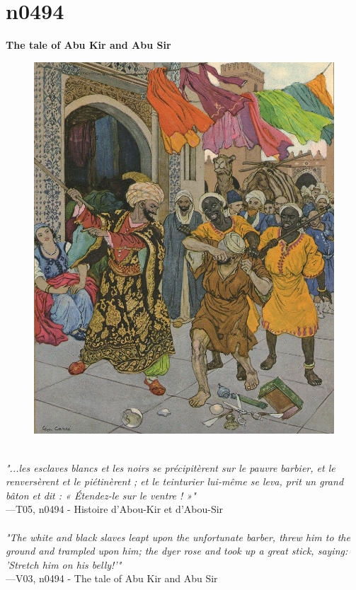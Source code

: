 \documentclass[../Carre_nights.tex]{subfiles}
\begin{document}
\newpage

\section{n0494}
\textbf{\Large{The tale of Abu Kir and Abu Sir}} \\

\begin{figure}[ht]
\centering
\includegraphics[height=\figsize]{illustrations/volume_5/T05, n0494 - Histoire d'Abou-Kir et d'Abou-Sir.jpg}
\end{figure}

\textit{\\
"...les esclaves blancs et les noirs se précipitèrent sur le pauvre barbier, et le renversèrent et le piétinèrent ; et le teinturier lui-même se leva, prit un grand bâton et dit : « Étendez-le sur le ventre ! »"} \\
—T05, n0494 - Histoire d'Abou-Kir et d'Abou-Sir \\~\\
\textit{"The white and black slaves leapt upon the unfortunate barber, threw him to the ground and trampled upon him; the dyer rose and took up a great stick, saying: 'Stretch him on his belly!'"} \\
—V03, n0494 - The tale of Abu Kir and Abu Sir
\end{document}
